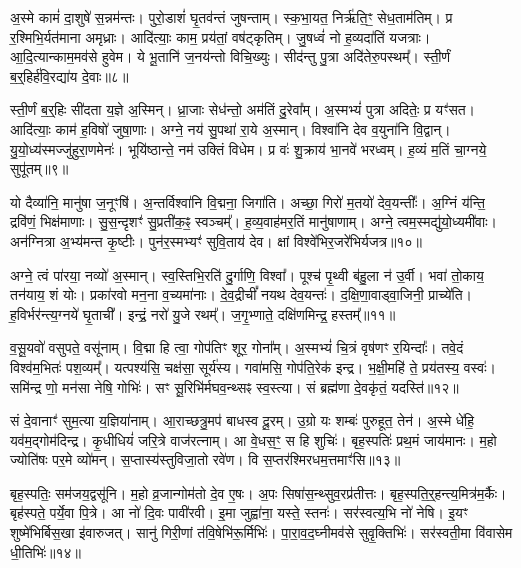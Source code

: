 अ॒स्मे कामं॑ दा॒शुषे॑ स॒न्नम॑न्तः।
पुरो॒डाशं॑ घृ॒तव॑न्तं जुषन्ताम्।
स्क॒भा॒यत॒ निर्\mbox{}ऋ॑ति॒ꣳ॒ सेध॒ताम॑तिम्।
प्र र॒श्मिभि॒र्यत॑माना अमृध्राः।
आदि॑त्याः॒ काम॒ प्रय॑तां॒ वष॑ट्कृतिम्।
जु॒षध्वं॑ नो ह॒व्यदा॑तिं यजत्राः।
आ॒दि॒त्यान्काम॒मव॑से हुवेम।
ये भू॒तानि॑ ज॒नय॑न्तो विचि॒ख्युः।
सीद॑न्तु पु॒त्रा अदि॑तेरु॒पस्थम्᳚।
स्ती॒र्णं ब॒र्॒हिर्\mbox{}ह॑वि॒रद्या॑य दे॒वाः॥८॥

स्ती॒र्णं ब॒र्॒हिः सी॑दता य॒ज्ञे अ॒स्मिन्।
ध्रा॒जाः सेध॑न्तो॒ अम॑तिं दु॒रेवा᳚म्।
अ॒स्मभ्यं॑ पुत्रा अदितेः॒ प्र यꣳ॑सत।
आदि॑त्याः॒ काम॑ ह॒विषो॑ जुषा॒णाः।
अग्ने॒ नय॑ सु॒पथा॑ रा॒ये अ॒स्मान्।
विश्वा॑नि देव व॒युना॑नि वि॒द्वान्।
यु॒यो॒ध्य॑स्मज्जु॑हुरा॒णमेनः॑।
भूयि॑ष्ठान्ते॒ नम॑ उक्तिं विधेम।
प्र वः॑ शु॒क्राय॑ भा॒नवे॑ भरध्वम्।
ह॒व्यं म॒तिं चा॒ग्नये॒ सुपू॑तम्॥९॥

यो दैव्या॑नि॒ मानु॑षा ज॒नूꣳषि॑।
अ॒न्तर्विश्वा॑नि वि॒द्मना॒ जिगा॑ति।
अच्छा॒ गिरो॑ म॒तयो॑ देव॒यन्तीः᳚।
अ॒ग्निं य॑न्ति॒ द्रवि॑णं॒ भिक्ष॑माणाः।
सु॒स॒न्दृशꣳ॑ सु॒प्रती॑क॒ꣴ॒ स्वञ्चम्᳚।
ह॒व्य॒वाह॑मर॒तिं मानु॑षाणाम्।
अग्ने॒ त्वम॒स्मद्यु॑यो॒ध्यमी॑वाः।
अन॑ग्नित्रा अ॒भ्य॑मन्त कृ॒ष्टीः।
पुन॑र॒स्मभ्यꣳ॑ सुवि॒ताय॑ देव।
क्षां विश्वे॑भिर॒जरे॑भिर्यजत्र॥१०॥

अग्ने॒ त्वं पा॑रया॒ नव्यो॑ अ॒स्मान्।
स्व॒स्तिभि॒रति॑ दु॒र्गाणि॒ विश्वा᳚।
पूश्च॑ पृ॒थ्वी ब॑हु॒ला न॑ उ॒र्वी।
भवा॑ तो॒काय॒ तन॑याय॒ शं योः।
प्रका॑रवो मन॒ना व॒च्यमा॑नाः।
दे॒व॒द्रीचीं᳚ नयथ देव॒यन्तः॑।
द॒क्षि॒णा॒वाड्वा॒जिनी॒ प्राच्ये॑ति।
ह॒विर्भर॑न्त्य॒ग्नये॑ घृ॒ताची᳚।
इन्द्रं॒ नरो॑ यु॒जे रथम्᳚।
ज॒गृ॒भ्णाते॒ दक्षि॑णमिन्द्र॒ हस्तम्᳚॥११॥

व॒सू॒यवो॑ वसुपते॒ वसू॑नाम्।
वि॒द्मा हि त्वा॒ गोप॑तिꣳ शूर॒ गोना᳚म्।
अ॒स्मभ्यं॑ चि॒त्रं वृष॑णꣳ र॒यिन्दाः᳚।
तवे॒दं विश्व॑म॒भितः॑ पश॒व्यम्᳚।
यत्पश्य॑सि॒ चक्ष॑सा॒ सूर्य॑स्य।
गवा॑मसि॒ गोप॑ति॒रेक॑ इन्द्र।
भ॒क्षी॒महि॑ ते॒ प्रय॑तस्य॒ वस्वः॑।
समि॑न्द्र णो॒ मन॑सा नेषि॒ गोभिः॑।
सꣳ सू॒रिभि॑र्मघव॒न्थ्सꣴ स्व॒स्त्या।
सं ब्रह्म॑णा दे॒वकृ॑तं॒ यदस्ति॑॥१२॥

सं दे॒वानाꣳ॑ सुम॒त्या य॒ज्ञिया॑नाम्।
आ॒राच्छत्रु॒मप॑ बाधस्व दू॒रम्।
उ॒ग्रो यः शम्बः॑ पुरुहूत॒ तेन॑।
अ॒स्मे धे॑हि॒ यव॑म॒द्गोम॑दिन्द्र।
कृ॒धीधियं॑ जरि॒त्रे वाज॑रत्नाम्।
आ वे॒धस॒ꣳ॒ स हि शुचिः॑।
बृह॒स्पतिः॑ प्रथ॒मं जाय॑मानः।
म॒हो ज्योति॑षः पर॒मे व्यो॑मन्।
स॒प्तास्य॑स्तुविजा॒तो रवे॑ण।
वि स॒प्तर॑श्मिरधम॒त्तमाꣳ॑सि॥१३॥

बृह॒स्पतिः॒ सम॑जय॒द्वसू॑नि।
म॒हो व्र॒जान्गोम॑तो दे॒व ए॒षः।
अ॒पः सिषा॑स॒न्थ्सुव॒रप्र॑तीत्तः।
बृह॒स्पति॒र्॒हन्त्य॒मित्र॑म॒र्कैः।
बृह॑स्पते॒ पर्ये॒वा पि॒त्रे।
आ नो॑ दि॒वः पावी॑रवी।
इ॒मा जुह्वा॑ना॒ यस्ते॒ स्तनः॑।
सर॑स्वत्य॒भि नो॑ नेषि।
इ॒यꣳ शुष्मे॑भिर्बिस॒खा इ॑वारुजत्।
सानु॑ गिरी॒णां त॑वि॒षेभि॑रू॒र्मिभिः॑।
पा॒रा॒व॒द॒घ्नीमव॑से सुवृ॒क्तिभिः॑।
सर॑स्वती॒मा वि॑वासेम धी॒तिभिः॑॥१४॥\anuvakamend[दे॒व॒यानै᳚र्दे॒वाः सुपू॑तं यजत्र॒ हस्त॒मस्ति॒ तमाꣴ॑स्यू॒र्मिभि॒र्द्वे च॑]


